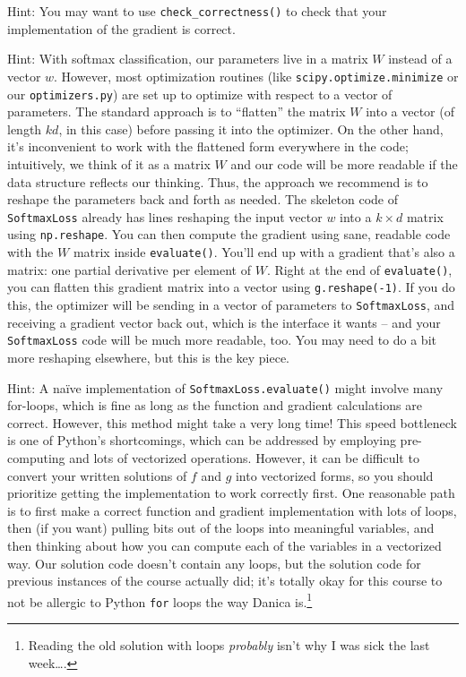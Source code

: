 \documentclass{article}
\begin{document}
Hint: You may want to use \verb|check_correctness()| to check that your implementation of the gradient is correct.

Hint: With softmax classification, our parameters live in a matrix $W$ instead of a vector $w$. However, most optimization routines (like \verb|scipy.optimize.minimize| or our \verb|optimizers.py|) are set up to optimize with respect to a vector of parameters. The standard approach is to ``flatten'' the matrix $W$ into a vector (of length $kd$, in this case) before passing it into the optimizer. On the other hand, it's inconvenient to work with the flattened form everywhere in the code; intuitively, we think of it as a matrix $W$ and our code will be more readable if the data structure reflects our thinking. Thus, the approach we recommend is to reshape the parameters back and forth as needed. The skeleton code of \verb|SoftmaxLoss| already has lines reshaping the input vector $w$ into a $k \times d$ matrix using \verb|np.reshape|. You can then compute the gradient using sane, readable code with the $W$ matrix inside \verb|evaluate()|. You'll end up with a gradient that's also a matrix: one partial derivative per element of $W$. Right at the end of \verb|evaluate()|, you can flatten this gradient matrix into a vector using \verb|g.reshape(-1)|. If you do this, the optimizer will be sending in a vector of parameters to \verb|SoftmaxLoss|, and receiving a gradient vector back out, which is the interface it wants -- and your \verb|SoftmaxLoss| code will be much more readable, too. You may need to do a bit more reshaping elsewhere, but this is the key piece.

Hint: A na\"ive implementation of \verb|SoftmaxLoss.evaluate()| might involve many for-loops, which is fine as long as the function and gradient calculations are correct. However, this method might take a very long time! This speed bottleneck is one of Python's shortcomings, which can be addressed by employing pre-computing and lots of vectorized operations. However, it can be difficult to convert your written solutions of $f$ and $g$ into vectorized forms, so you should prioritize getting the implementation to work correctly first. One reasonable path is to first make a correct function and gradient implementation with lots of loops, then (if you want) pulling bits out of the loops into meaningful variables, and then thinking about how you can compute each of the variables in a vectorized way. Our solution code doesn't contain any loops, but the solution code for previous instances of the course actually did; it's totally okay for this course to not be allergic to Python \verb|for| loops the way Danica is.\footnote{Reading the old solution with loops \emph{probably} isn't why I was sick the last week\dots.}
\end{document}
